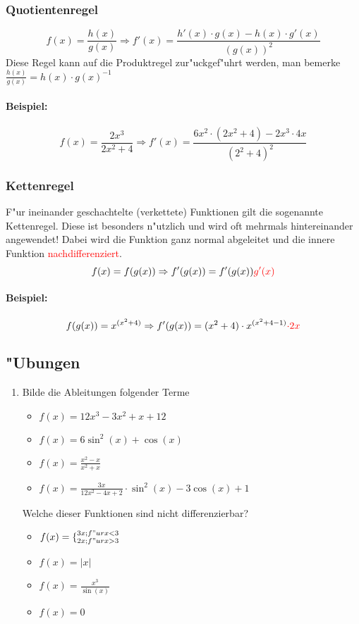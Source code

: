 \subsubsection{Quotientenregel}
\begin{equation*}
f(x)=\frac{h(x)}{g(x)} \Rightarrow f'(x)=\frac{h'(x) \cdot g(x)-h(x) \cdot g'(x)}{(g(x))^2}
\end{equation*}
Diese Regel kann auf die Produktregel zur"uckgef"uhrt werden, man bemerke $\frac{h(x)}{g(x)} = h(x) \cdot g(x)^{-1}$

\paragraph{Beispiel:}
\begin{equation*}
f(x)=\frac{2x^3}{2x^2+4} \Rightarrow f'(x)=\frac{6x^2 \cdot (2x^2+4)-2x^3 \cdot 4x}{(2^2+4)^2}
\end{equation*}

\subsubsection{Kettenregel}
F"ur ineinander geschachtelte (verkettete) Funktionen gilt die sogenannte Kettenregel. Diese ist besonders n"utzlich und wird oft mehrmals hintereinander angewendet! Dabei wird die Funktion ganz normal abgeleitet und die innere Funktion \textcolor{red}{nachdifferenziert}.
\begin{equation*}
f(x)=f(g(x))\Rightarrow f'(g(x))=f'(g(x))\textcolor{red}{g'(x)}
\end{equation*}

\paragraph{Beispiel:}
\begin{equation*}
f(g(x))=x^{(x^2+4)}\Rightarrow f'(g(x))=(x^2+4)\cdot x^{(x^2+4-1)}\textcolor{red}{ \cdot 2x}
\end{equation*}

\subsection{"Ubungen}
\begin{enumerate}
\item Bilde die Ableitungen folgender Terme
\begin{itemize}
\item $f(x)=12x^3 - 3x^2 + x + 12$
\item $f(x)= 6 \sin^2(x) + \cos(x) $
\item $f(x)= \frac{x^2-x}{x^2+x}$
\item $f(x)= \frac{3x}{12x^2 - 4x + 2} \cdot \sin^2(x) - 3 \cos(x) + 1$
\end{itemize}
Welche dieser Funktionen sind nicht differenzierbar?
\begin{itemize}
\item $f(x)=\lbrace^{3x; f"ur x < 3}_{2x; f"ur x>3}$
\item $f(x)=|x|$
\item $f(x)= \frac{x^3}{\sin(x)}$
\item $f(x)= 0$
\end{itemize}
\end{enumerate}